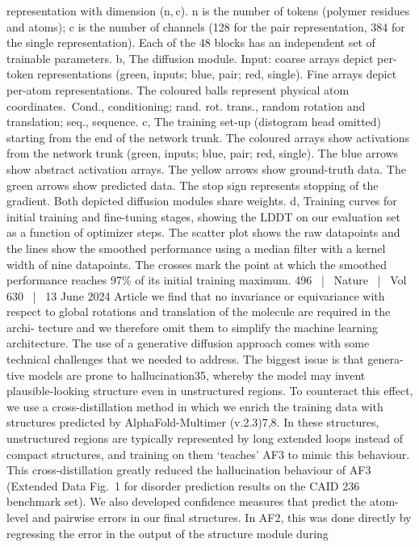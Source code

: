 representation with dimension (n, c). n is the number of tokens (polymer
residues and atoms); c is the number of channels (128 for the pair representation,
384 for the single representation). Each of the 48 blocks has an independent set
of trainable parameters. b, The diffusion module. Input: coarse arrays depict
per-token representations (green, inputs; blue, pair; red, single). Fine arrays
depict per-atom representations. The coloured balls represent physical atom
coordinates. Cond., conditioning; rand. rot. trans., random rotation and
translation; seq., sequence. c, The training set-up (distogram head omitted)
starting from the end of the network trunk. The coloured arrays show activations
from the network trunk (green, inputs; blue, pair; red, single). The blue arrows
show abstract activation arrays. The yellow arrows show ground-truth data.
The green arrows show predicted data. The stop sign represents stopping of
the gradient. Both depicted diffusion modules share weights. d, Training
curves for initial training and fine-tuning stages, showing the LDDT on our
evaluation set as a function of optimizer steps. The scatter plot shows the raw
datapoints and the lines show the smoothed performance using a median filter
with a kernel width of nine datapoints. The crosses mark the point at which the
smoothed performance reaches 97\% of its initial training maximum.
496  |  Nature  |  Vol 630  |  13 June 2024
Article
we find that no invariance or equivariance with respect to global
rotations and translation of the molecule are required in the archi-
tecture and we therefore omit them to simplify the machine learning
architecture.
The use of a generative diffusion approach comes with some technical
challenges that we needed to address. The biggest issue is that genera-
tive models are prone to hallucination35, whereby the model may invent
plausible-looking structure even in unstructured regions. To counteract
this effect, we use a cross-distillation method in which we enrich the
training data with structures predicted by AlphaFold-Multimer (v.2.3)7,8.
In these structures, unstructured regions are typically represented
by long extended loops instead of compact structures, and training
on them ‘teaches’ AF3 to mimic this behaviour. This cross-distillation
greatly reduced the hallucination behaviour of AF3 (Extended Data
Fig. 1 for disorder prediction results on the CAID 236 benchmark set).
We also developed confidence measures that predict the atom-level
and pairwise errors in our final structures. In AF2, this was done directly
by regressing the error in the output of the structure module during
